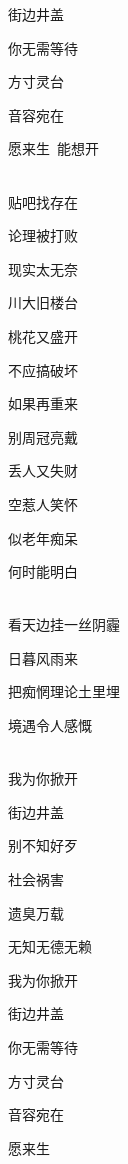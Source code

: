 \documentclass[UTF8,12pt,oneside]{ctexbook}
\begin{document}
\begin{center}
            街边井盖
            
            你无需等待
            
            方寸灵台
            
            音容宛在
            
            愿来生\ 能想开

            ~\\
            贴吧找存在
            
            论理被打败
            
            现实太无奈
            
            川大旧楼台
            
            桃花又盛开
            
            不应搞破坏
            
            如果再重来
            
            别周冠亮戴
            
            丢人又失财
            
            空惹人笑怀
            
            似老年痴呆
            
            何时能明白

            ~\\
            看天边挂一丝阴霾
            
            日暮风雨来
            
            把痴惘理论土里埋
            
            境遇令人感慨

            ~\\
            我为你掀开
            
            街边井盖
            
            别不知好歹
            
            社会祸害
            
            遗臭万载
            
            无知无德无赖
            
            我为你掀开
            
            街边井盖
            
            你无需等待
            
            方寸灵台
            
            音容宛在
            
            愿来生


\end{center}
\end{document}
